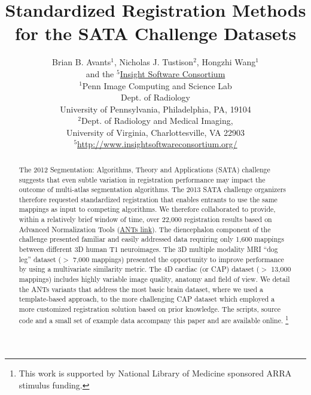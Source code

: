 \documentclass{llncs}
\begin{document}
\vspace{-0.1in}
\title{Standardized Registration Methods for the SATA Challenge Datasets}
\author{Brian B. Avants$^1$, Nicholas J. Tustison$^2$, Hongzhi
  Wang$^1$ \\and the
  $^5$\href{http://www.insightsoftwareconsortium.org/}{Insight Software Consortium}\\
$^1$Penn Image Computing and Science Lab \\ Dept. of Radiology \\University of
  Pennsylvania, Philadelphia, PA, 19104\\ 
  $^2$Dept. of Radiology and Medical Imaging, \\ University of Virginia,
  Charlottesville, VA 22903\\
 $^5$\href{http://www.insightsoftwareconsortium.org/}{http://www.insightsoftwareconsortium.org/}}
\maketitle              
\begin{abstract}
The 2012 Segmentation: Algorithms, Theory and Applications (SATA)
challenge suggests that even subtle variation in registration
performance may impact the outcome of multi-atlas segmentation
algorithms. The 2013 SATA challenge organizers therefore requested
standardized registration that enables entrants to use the same
mappings as input to competing algorithms.  We therefore collaborated
to provide, within a relatively brief window of time, over 22,000
registration results based on Advanced Normalization Tools
(\href{http://stnava.github.io/ANTs/}{ANTs link}).
The diencephalon component of the challenge presented familiar and
easily addressed data requiring only 1,600 mappings between different
3D human T1 neuroimages.  The 3D multiple modality MRI ``dog leg'' dataset ($>$ 7,000
mappings) presented the opportunity to improve performance by using
a multivariate similarity metric.  The 4D cardiac (or CAP) dataset
($>$ 13,000 mappings) includes highly variable image quality, anatomy
and field of view.  We detail the ANTs variants that address the most basic brain dataset, where we used
a template-based approach, to the more challenging CAP dataset which
employed a more customized registration solution based on prior
knowledge.  The scripts, source code and a small set of example data
accompany this paper and are available online.  
\footnote{This work is supported by National Library of Medicine sponsored ARRA stimulus
funding.}
\end{abstract}
\end{document}
